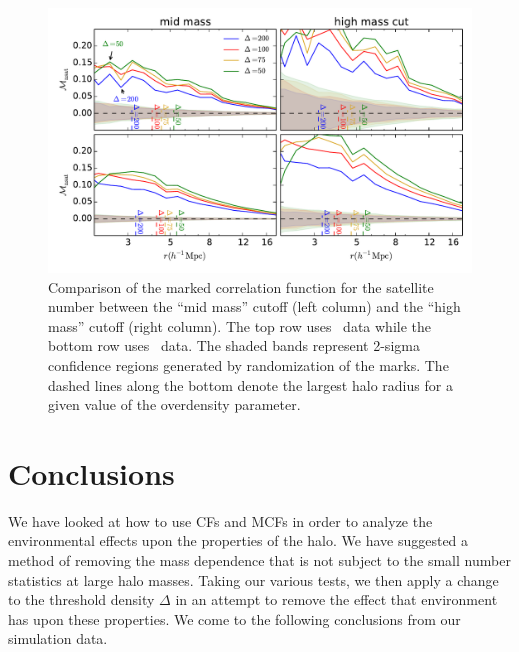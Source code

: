 \documentclass[usenatbib,usegraphicx,letterpaper]{mn2e}
\begin{document}
\begin{figure}
	\centering
	\includegraphics[width=.9\textwidth]{all_mcf_nsat_z00_hostsvhigh.pdf}
	\caption{Comparison of the marked correlation function for the satellite number between the ``mid mass'' cutoff (left column) and the ``high mass'' cutoff (right column). The top row uses \simB \ data while the bottom row uses \simC \ data. The shaded bands represent 2-sigma confidence regions generated by randomization of the marks. The dashed lines along the bottom denote the largest halo radius for a given value of the overdensity parameter.}
	\label{fig:hvh_mcf_nsat}
\end{figure}




\section[]{Conclusions}
\label{section:conclusions}

We have looked at how to use CFs and MCFs in order to analyze the environmental effects upon the properties of the halo. We have suggested a method of removing the mass dependence that is not subject to the small number statistics at large halo masses. Taking our various tests, we then apply a change to the threshold density $\Delta$ in an attempt to remove the effect that environment has upon these properties. We come to the following conclusions from our simulation data.
\end{document}
